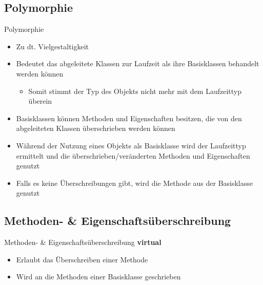 \subsection{Polymorphie}
\begin{frame}{Polymorphie}
	\begin{itemize}
		\item Zu dt. Vielgestaltigkeit
		\item Bedeutet das abgeleitete Klassen zur Laufzeit als ihre Basisklassen behandelt werden können
		\begin{itemize}
			\item Somit stimmt der Typ des Objekts nicht mehr mit dem Laufzeittyp überein
		\end{itemize}
		\item Basisklassen können Methoden und Eigenschaften besitzen, die von den abgeleiteten Klassen überschrieben werden können
		\item Während der Nutzung eines Objekts als Basisklasse wird der Laufzeittyp ermittelt und die überschrieben/veränderten Methoden und Eigenschaften genutzt
		\item Falls es keine Überschreibungen gibt, wird die Methode aus der Basisklasse genutzt
	\end{itemize} 
\end{frame}

\subsection{Methoden- \& Eigenschaftsüberschreibung}
\begin{frame}{Methoden- \& Eigenschaftsüberschreibung}	
	\textbf{virtual}\\
	\begin{itemize}
		\item Erlaubt das Überschreiben einer Methode
		\item Wird an die Methoden einer Basisklasse geschrieben
	\end{itemize}
	
\end{frame}

